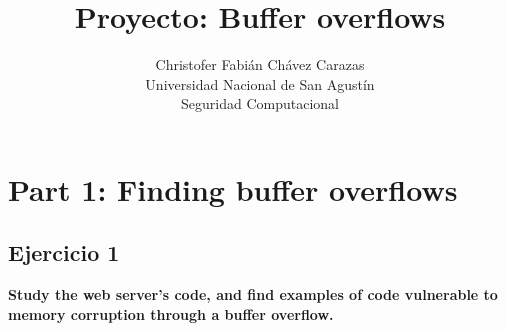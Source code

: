 \documentclass[a4paper,12pt]{article}
\begin{document}
\title{Proyecto: Buffer overflows}
\author{
Christofer Fabián Chávez Carazas \\
\small{Universidad Nacional de San Agustín} \\
\small{Seguridad Computacional}
}

\maketitle

\section{Part 1: Finding buffer overflows}

\subsection{Ejercicio 1}

\textbf{Study the web server's code, and find examples of code vulnerable to
memory corruption through a buffer overflow.}
\end{document}
